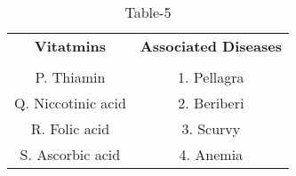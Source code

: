 \begin{table}[htbp]
  \centering
  \caption{Table-5}
  \label{tab:tables/table5.tex}
  \begin{tabular}{cc}
  \textbf{Vitatmins} & \textbf{Associated Diseases} \\ \\
    P. Thiamin & 1. Pellagra \\
    Q. Niccotinic acid & 2. Beriberi\\
    R. Folic acid & 3. Scurvy \\
    S. Ascorbic acid & 4. Anemia \\
  \end{tabular}
\end{table}